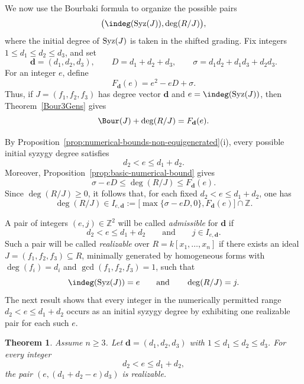 \documentclass[11pt]{amsart} %
\newtheorem{Theorem}{Theorem}[section]
\theoremstyle{definition}
\def\syz{\mbox{\rm Syz}}
\begin{document}
We now use the Bourbaki formula to organize the possible pairs
\[
\bigl(\indeg(\syz(J)),\deg(R/J)\bigr),
\]
where the initial degree of $\syz(J)$ is taken in the shifted grading. Fix
integers $1\le d_1\le d_2\le d_3$, and set
\[
\mathbf d=(d_1,d_2,d_3),\qquad
D=d_1+d_2+d_3,\qquad
\sigma=d_1d_2+d_1d_3+d_2d_3.
\]
For an integer $e$, define
\[
F_{\mathbf d}(e)=e^2-eD+\sigma.
\]
Thus, if $J=(f_1,f_2,f_3)$ has degree vector $\mathbf d$ and
$e=\indeg(\syz(J))$, then Theorem~\ref{Bour3Gens} gives
\[
\Bour(J)+\deg(R/J)=F_{\mathbf d}(e).
\]

By Proposition~\ref{prop:numerical-bounds-non-equigenerated}{\rm(i)}, every
possible initial syzygy degree satisfies
\[
d_2<e\le d_1+d_2.
\]
Moreover, Proposition~\ref{prop:basic-numerical-bound} gives
\[
\sigma-eD\le\deg(R/J)\le F_{\mathbf d}(e).
\]
Since $\deg(R/J)\ge0$, it follows that, for each fixed
$d_2<e\le d_1+d_2$, one has
\[
\deg(R/J)\in I_{e,\mathbf d}:=
\bigl[\max\{\sigma-eD,0\},F_{\mathbf d}(e)\bigr]\cap\mathbb Z.
\]

A pair of integers $(e,j) \in \mathbb{Z}^2$ will be called \emph{admissible} for $\mathbf d$ if
\[
d_2<e\le d_1+d_2
\qquad\text{and}\qquad
j\in I_{e,\mathbf d}.
\]
Such a pair will be called \emph{realizable} over
$R=k[x_1,\ldots,x_n]$ if there exists an ideal
$J=(f_1,f_2,f_3)\subseteq R$, minimally generated by homogeneous forms with
$\deg(f_i)=d_i$ and $\gcd(f_1,f_2,f_3)=1$, such that
\[
\indeg(\syz(J))=e
\qquad\text{and}\qquad
\deg(R/J)=j.
\]
The next result shows that every integer in the numerically permitted range
$d_2<e\le d_1+d_2$ occurs as an initial syzygy degree by exhibiting one
realizable pair for each such $e$.



\begin{Theorem}\label{thm:every-e-occurs-structurally}
Assume $n\ge3$. Let $\mathbf d=(d_1,d_2,d_3)$ with
$1\le d_1\le d_2\le d_3$. For every integer
\[
d_2<e\le d_1+d_2,
\]
the pair $(e, (d_1 + d_2 - e)d_3)$ is realizable.
\end{Theorem}
\end{document}

